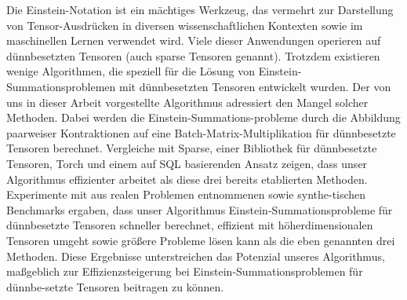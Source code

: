 Die Einstein-Notation ist ein mächtiges Werkzeug, das vermehrt zur Darstellung von Tensor-Ausdrücken
in diversen wissenschaftlichen Kontexten sowie im maschinellen Lernen verwendet wird. Viele dieser
Anwendungen operieren auf dünnbesetzten Tensoren (auch sparse Tensoren genannt). Trotzdem existieren wenige
Algorithmen, die speziell für die Lösung von Einstein-Summationsproblemen mit dünnbesetzten Tensoren
entwickelt wurden. Der von uns in dieser Arbeit vorgestellte Algorithmus adressiert den Mangel solcher Methoden.
Dabei werden die Einstein-Summations-probleme durch die Abbildung paarweiser Kontraktionen auf eine Batch-Matrix-Multiplikation
für dünnbesetzte Tensoren berechnet. Vergleiche mit Sparse, einer Bibliothek für dünnbesetzte Tensoren, Torch und
einem auf SQL basierenden Ansatz zeigen, dass unser Algorithmus effizienter arbeitet als diese drei bereits
etablierten Methoden. Experimente mit aus realen Problemen entnommenen sowie synthe-tischen Benchmarks
ergaben, dass unser Algorithmus Einstein-Summationsprobleme für dünnbesetzte Tensoren schneller berechnet,
effizient mit höherdimensionalen Tensoren umgeht sowie größere Probleme lösen kann als die eben genannten drei Methoden.
Diese Ergebnisse unterstreichen das Potenzial unseres Algorithmus, maßgeblich zur Effizienzsteigerung
bei Einstein-Summationsproblemen für dünnbe-setzte Tensoren beitragen zu können.